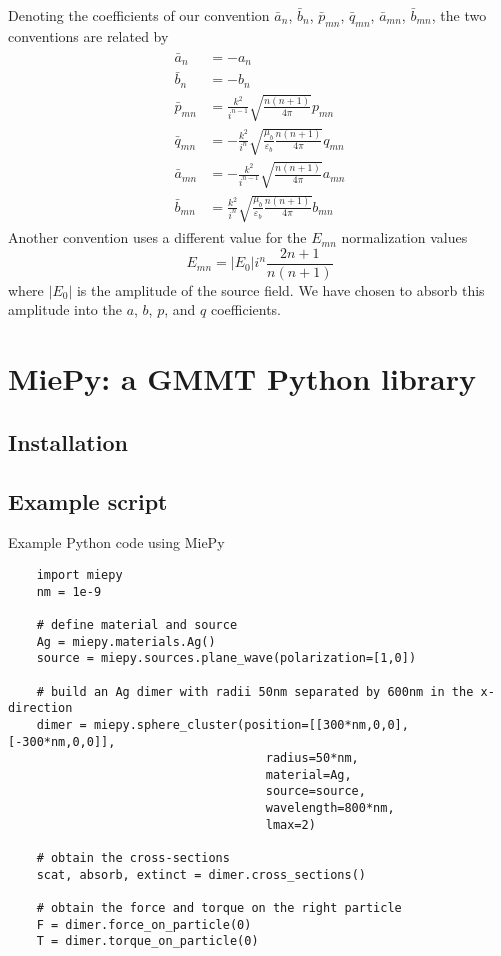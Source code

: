 \documentclass[11pt]{article}
\begin{document}
Denoting the coefficients of our convention $\bar a_n$, $\bar b_n$, $\bar p_{mn}$, $\bar q_{mn}$, $\bar a_{mn}$, $\bar b_{mn}$, the two conventions are related by
\begin{align}
\begin{split}
    \bar a_{n} &= - a_{n} \\
    \bar b_{n} &= - b_{n} \\
    \bar p_{mn} &= \frac{k^2}{i^{n-1}}\sqrt{\frac{n(n+1)}{4\pi}} p_{mn} \\
    \bar q_{mn} &= -\frac{k^2}{i^n}\sqrt{\frac{\mu_b}{\varepsilon_b} \frac{n(n+1)}{4\pi}} q_{mn} \\
    \bar a_{mn} &= -\frac{k^2}{i^{n-1}}\sqrt{\frac{n(n+1)}{4\pi}} a_{mn} \\
    \bar b_{mn} &= \frac{k^2}{i^n}\sqrt{\frac{\mu_b}{\varepsilon_b} \frac{n(n+1)}{4\pi}} b_{mn}
\end{split}
\end{align}
Another convention uses a different value for the $E_{mn}$ normalization values \cite{xu1995electromagnetic}
\begin{equation}
    E_{mn} = |E_0|i^n \frac{2n+1}{n(n+1)}
\end{equation}
where $|E_0|$ is the amplitude of the source field.
We have chosen to absorb this amplitude into the $a$, $b$, $p$, and $q$ coefficients.

\section{MiePy: a GMMT Python library}
\subsection{Installation}

\subsection{Example script}

Example Python code using MiePy
\begin{lstlisting}
    import miepy
    nm = 1e-9

    # define material and source
    Ag = miepy.materials.Ag()
    source = miepy.sources.plane_wave(polarization=[1,0])

    # build an Ag dimer with radii 50nm separated by 600nm in the x-direction
    dimer = miepy.sphere_cluster(position=[[300*nm,0,0], [-300*nm,0,0]],
                                    radius=50*nm,
                                    material=Ag,
                                    source=source,
                                    wavelength=800*nm,
                                    lmax=2)

    # obtain the cross-sections
    scat, absorb, extinct = dimer.cross_sections()

    # obtain the force and torque on the right particle
    F = dimer.force_on_particle(0)
    T = dimer.torque_on_particle(0)
\end{lstlisting}
\end{document}
